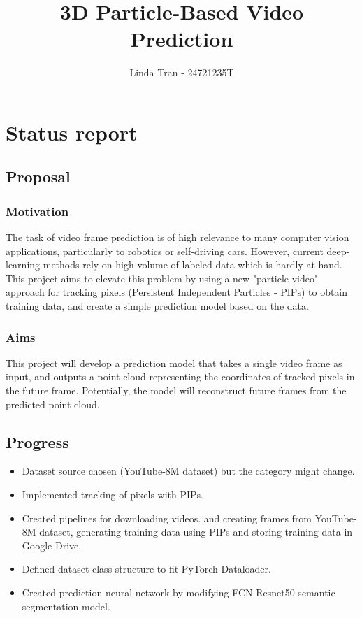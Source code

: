 \documentclass[11pt]{article}
\title{3D Particle-Based Video Prediction}
\author{Linda Tran - 24721235T }
\begin{document}
    \maketitle
 

\section{Status report}

\subsection{Proposal}\label{proposal}

\subsubsection{Motivation}\label{motivation}
The task of video frame prediction is of high relevance to many computer vision applications, particularly to robotics or self-driving cars. However, current deep-learning methods rely on high volume of labeled data which is hardly at hand. This project aims to elevate this problem by using a new "particle video" approach for tracking pixels (Persistent Independent Particles - PIPs) to obtain training data, and create a simple prediction model based on the data.

\subsubsection{Aims}\label{aims}
This project will develop a prediction model that takes a single video frame as input, and outputs a point cloud representing the coordinates of tracked pixels in the future frame. Potentially, the model will reconstruct future frames from the predicted point cloud.

\subsection{Progress}\label{progress}
\begin{itemize}
\itemsep0em
    \item Dataset source chosen (YouTube-8M dataset) but the category might change.
    \item Implemented tracking of pixels with PIPs.
    \item Created pipelines for downloading videos.
    and creating frames from YouTube-8M dataset, generating training data using PIPs and storing training data in Google Drive.
    \item Defined dataset class structure to fit PyTorch Dataloader.
    \item Created prediction neural network by modifying FCN Resnet50 semantic segmentation model.
\end{itemize}    
\end{document}
